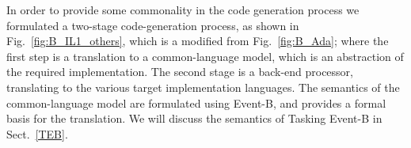 %
In order to provide some commonality in the code generation process we formulated a two-stage code-generation process, as shown in Fig.~\ref{fig:B_IL1_others}, which is a modified from Fig.~\ref{fig:B_Ada}; where the first step is a translation to a common-language model, which is an abstraction of the required implementation. The second stage is a back-end processor, translating to the various target implementation languages. The semantics of the common-language model are formulated using Event-B, and provides a formal basis for the translation. We will discuss the semantics of Tasking Event-B in Sect.~\ref{TEB}.
